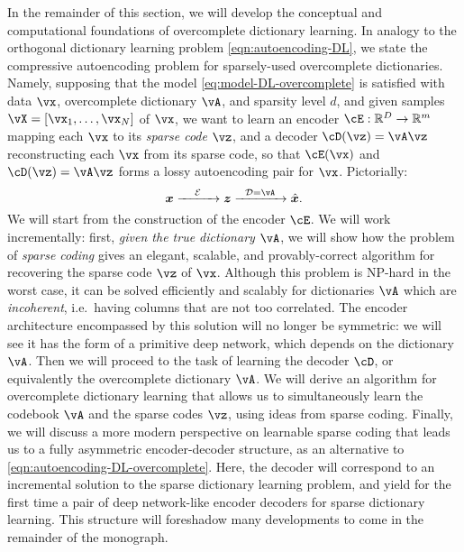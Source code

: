 \documentclass[\toplevelprefix/book-main.tex]{subfiles}
\begin{document}
In the remainder of this section, we will develop the conceptual and computational foundations of overcomplete dictionary learning.
In analogy to the orthogonal dictionary learning problem \eqref{eqn:autoencoding-DL}, we state the compressive autoencoding problem for sparsely-used overcomplete dictionaries. Namely, supposing that the model \eqref{eq:model-DL-overcomplete} is satisfied with data \(\vx\), overcomplete dictionary \(\vA\), and sparsity level \(d\), and given samples \(\vX = [\vx_1, \dots, \vx_N]\) of \(\vx\), we want to learn an encoder \(\cE : \R^D \to \R^m\) mapping each \(\vx\) to its \textit{sparse code} \(\vz\), and a decoder \(\cD(\vz) = \vA \vz\) reconstructing each \(\vx\) from its sparse code, so that \(\cE(\vx)\) and \(\cD(\vz) = \vA\vz\) forms a lossy autoencoding pair for \(\vx\). Pictorially:
\begin{equation}
\x \xrightarrow{\hspace{4mm} \mathcal{E} \hspace{4mm}}  \z \xrightarrow{\hspace{2mm} \mathcal{D} = \vA \hspace{2mm}}   \hat{\x}.  
\label{eqn:autoencoding-DL-overcomplete}
\end{equation}    
We will start from the construction of the encoder $\cE$.
We will work incrementally: first, \textit{given the true dictionary $\vA$}, we will show how the problem of \textit{sparse coding} gives an elegant, scalable, and provably-correct algorithm for recovering the sparse code $\vz$ of $\vx$.
Although this problem is NP-hard in the worst case, it can be solved efficiently and scalably for dictionaries $\vA$ which are \textit{incoherent}, i.e.\ having columns that are not too correlated.
The encoder architecture encompassed by this solution will no longer be symmetric: we will see it has the form of a primitive deep network, which depends on the dictionary $\vA$.
Then we will proceed to the task of learning the decoder $\cD$, or equivalently the overcomplete dictionary $\vA$.
We will derive an algorithm for overcomplete dictionary learning that allows us 
to simultaneously learn the codebook $\vA$ and the sparse codes $\vz$, using ideas from sparse coding.
Finally, we will discuss a more modern perspective on learnable sparse coding that leads us to a fully asymmetric encoder-decoder structure, as an alternative to \eqref{eqn:autoencoding-DL-overcomplete}.
Here, the decoder will correspond to an incremental solution to the sparse dictionary learning problem, and yield for the first time a pair of deep network-like encoder decoders for sparse dictionary learning.
This structure will foreshadow many developments to come in the remainder of the monograph.
\end{document}

